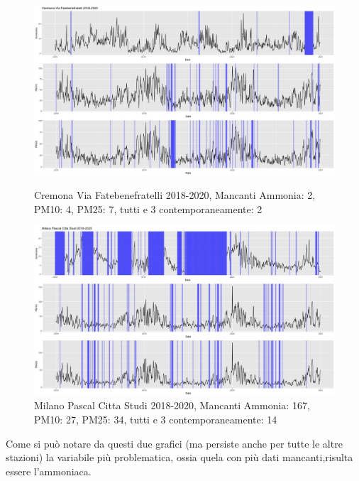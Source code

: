 \documentclass{article}
\begin{document}
\begin{figure}[h!]
    \centering
    \includegraphics[scale=0.35]{Picture/Cremona Via Fatebenefratelli 2018-2020 .jpeg} 
    \caption{Cremona Via Fatebenefratelli 2018-2020, Mancanti Ammonia: 2, PM10: 4, PM25: 7, tutti e 3 contemporaneamente: 2}
    \centering
    \includegraphics[scale=0.35]{Picture/Milano Pascal Citta Studi 2018-2020 .jpeg}
    \caption{Milano Pascal Citta Studi 2018-2020, Mancanti Ammonia: 167, PM10: 27, PM25: 34, tutti e 3 contemporaneamente: 14}
\end{figure}
Come si può notare da questi due grafici (ma persiste anche per tutte le altre stazioni) la variabile
più problematica, ossia quela con più dati mancanti,risulta essere l'ammoniaca.
\end{document}
